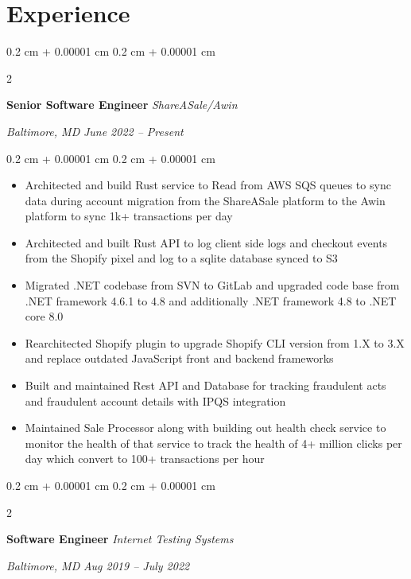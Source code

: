 \documentclass[10pt, letterpaper]{article}
\newenvironment{highlights}{
    \begin{itemize}[
        topsep=0.10 cm,
        parsep=0.10 cm,
        partopsep=0pt,
        itemsep=0pt,
        leftmargin=0.4 cm + 10pt
        ]
    }{
\end{itemize}
} %
\newenvironment{onecolentry}{
    \begin{adjustwidth}{
            0.2 cm + 0.00001 cm
        }{
            0.2 cm + 0.00001 cm
        }
    }{
    \end{adjustwidth}
} %
\newenvironment{twocolentry}[2][]{
    \onecolentry
    \def\secondColumn{#2}
    \setcolumnwidth{\fill, 10.5 cm}
    \begin{paracol}{2}
    }{
        \switchcolumn \raggedleft \secondColumn
    \end{paracol}
    \endonecolentry
} %
\begin{document}
\section{Experience}
\begin{twocolentry}{
    \textit{Baltimore, MD}
    \textit{June 2022 – Present}}
    \textbf{Senior Software Engineer}
    \textit{ShareASale/Awin}
\end{twocolentry}
\begin{onecolentry}
    \begin{highlights}
        \item Architected and build Rust service to Read  from AWS SQS queues to sync data during account migration from the ShareASale platform to the Awin platform to sync 1k+ transactions per day
        \item Architected and built Rust API to log client side logs and checkout events from the Shopify pixel and log to a sqlite database synced to S3
        \item Migrated .NET codebase from SVN to GitLab and upgraded code base from .NET framework 4.6.1 to 4.8 and additionally .NET framework 4.8 to .NET core 8.0
        \item Rearchitected Shopify plugin to upgrade Shopify CLI version from 1.X to 3.X and replace outdated JavaScript front and backend frameworks
        \item Built and maintained Rest API and Database for tracking fraudulent acts and fraudulent account details with IPQS integration
        \item Maintained Sale Processor along with building out health check service to monitor the health of that service to track the health of 4+ million clicks per day which convert to 100+ transactions per hour
        \end{highlights}
    \end{onecolentry}
    \vspace{0.2 cm}
    \begin{twocolentry}{
            \textit{Baltimore, MD}
        \textit{Aug 2019 – July 2022}}
        \textbf{Software Engineer}
        \textit{Internet Testing Systems}
    \end{twocolentry}
    \vspace{0.10 cm}
\end{document}
